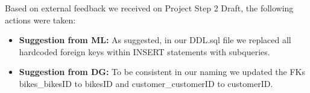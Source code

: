 \documentclass{article}
\begin{document}
\vspace{0.5cm}
\begin{tcolorbox}[colback=secondarycolor, colframe=primarycolor, arc=5mm, title=\textbf{Step 2 --> Step 3 }]
Based on external feedback we received on Project Step 2 Draft, the following actions were taken:
\vspace{0.2cm}
\begin{itemize}
  \item \textbf{Suggestion from ML:} As suggested, in our DDL.sql file we replaced all hardcoded foreign keys within INSERT statements with subqueries.
   \vspace{0.1cm}
  \item \textbf{Suggestion from DG:} To be consistent in our naming we updated the FKs bikes\_bikesID to bikesID and customer\_customerID to customerID.
 \end{itemize}
\vspace{0.2cm}
\end{tcolorbox}
\end{document}
